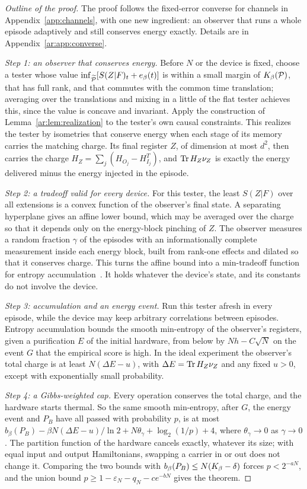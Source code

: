 \begin{proof}[Outline of the proof]
The proof follows the fixed-error converse for channels in Appendix~\ref{app:channels}, with one new ingredient: an observer that runs a whole episode adaptively and still conserves energy exactly. Details are in Appendix~\ref{ar:app:converse}.

\emph{Step 1: an observer that conserves energy.} Before $N$ or the device is fixed, choose a tester whose value $\inf_{\widetilde{\mathcal P}}[S(Z|F)_t+e_\beta(t)]$ is within a small margin of $K_\beta(\mathcal P)$, that has full rank, and that commutes with the common time translation; averaging over the translations and mixing in a little of the flat tester achieves this, since the value is concave and invariant. Apply the construction of Lemma~\ref{ar:lem:realization} to the tester's own causal constraints. This realizes the tester by isometries that conserve energy when each stage of its memory carries the matching charge. Its final register $Z$, of dimension at most $d^2$, then carries the charge $H_Z=\sum_j(H_{O_j}-H_{I_j}^T)$, and $\operatorname{Tr} H_Z\nu_Z$ is exactly the energy delivered minus the energy injected in the episode.

\emph{Step 2: a tradeoff valid for every device.} For this tester, the least $S(Z|F)$ over all extensions is a convex function of the observer's final state. A separating hyperplane gives an affine lower bound, which may be averaged over the charge so that it depends only on the energy-block pinching of $Z$. The observer measures a random fraction $\gamma$ of the episodes with an informationally complete measurement inside each energy block, built from rank-one effects and dilated so that it conserves charge. This turns the affine bound into a min-tradeoff function for entropy accumulation~\cite{DFR20}. It holds whatever the device's state, and its constants do not involve the device.

\emph{Step 3: accumulation and an energy event.} Run this tester afresh in every episode, while the device may keep arbitrary correlations between episodes. Entropy accumulation bounds the smooth min-entropy of the observer's registers, given a purification $E$ of the initial hardware, from below by $N h-C\sqrt N$ on the event $G$ that the empirical score is high. In the ideal experiment the observer's total charge is at least $N(\Delta E-u)$, with $\Delta E=\operatorname{Tr} H_Z\nu_Z$ and any fixed $u>0$, except with exponentially small probability.

\emph{Step 4: a Gibbs-weighted cap.} Every operation conserves the total charge, and the hardware starts thermal. So the same smooth min-entropy, after $G$, the energy event and $P_B$ have all passed with probability $p$, is at most $b_\beta(P_B)-\beta N(\Delta E-u)/\ln2+N\theta_\gamma+\log_2(1/p)+4$, where $\theta_\gamma\to0$ as $\gamma\to0$. The partition function of the hardware cancels exactly, whatever its size; with equal input and output Hamiltonians, swapping a carrier in or out does not change it. Comparing the two bounds with $b_\beta(P_B)\le N(K_\beta-\delta)$ forces $p<2^{-aN}$, and the union bound $p\ge1-\varepsilon_N-q_N-ce^{-bN}$ gives the theorem.
\end{proof}


